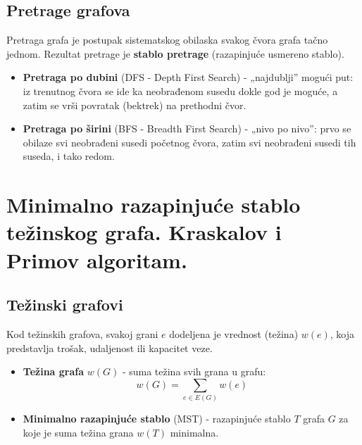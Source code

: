 \documentclass[a4paper,12pt]{article}
\numberwithin{algorithm}{section}
\theoremstyle{plain}
\theoremstyle{definition}
\theoremstyle{remark}
\begin{document}
\subsection{Pretrage grafova}
Pretraga grafa je postupak sistematskog obilaska svakog čvora grafa tačno jednom. Rezultat pretrage je \textbf{stablo pretrage} (razapinjuće usmereno stablo).

\begin{itemize}
    \item \textbf{Pretraga po dubini} (DFS - Depth First Search) - „najdublji” mogući put: iz trenutnog čvora se ide ka neobrađenom susedu dokle god je moguće, a zatim se vrši povratak (bektrek) na prethodni čvor. 
    \item \textbf{Pretraga po širini} (BFS - Breadth First Search) - „nivo po nivo”: prvo se obilaze svi neobrađeni susedi početnog čvora, zatim svi neobrađeni susedi tih suseda, i tako redom.
\end{itemize}






\newpage
\section{Minimalno razapinjuće stablo težinskog grafa. Kraskalov i Primov algoritam. }

\subsection{Težinski grafovi}
Kod težinskih grafova, svakoj grani $e$ dodeljena je vrednost (težina) $w(e)$, koja predstavlja trošak, udaljenost ili kapacitet veze.

\begin{itemize}
    \item \textbf{Težina grafa} $w(G)$ - suma težina svih grana u grafu:
    $$w(G) = \sum_{e \in E(G)} w(e)$$
    \item \textbf{Minimalno razapinjuće stablo} (MST) - razapinjuće stablo $T$ grafa $G$ za koje je suma težina grana $w(T)$ minimalna.
\end{itemize}
\end{document}
